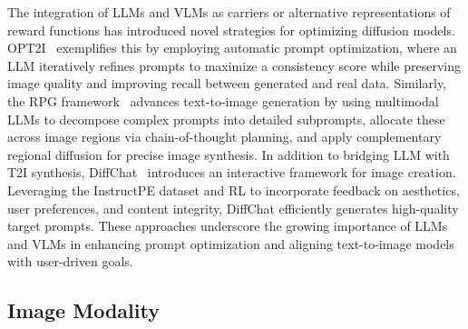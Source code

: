The integration of LLMs and VLMs as carriers or alternative representations of reward functions has introduced novel strategies for optimizing diffusion models. OPT2I~\citep{manas2024improving} exemplifies this by employing automatic prompt optimization, where an LLM iteratively refines prompts to maximize a consistency score while preserving image quality and improving recall between generated and real data. Similarly, the RPG framework~\citep{yang2024mastering} advances text-to-image generation by using multimodal LLMs to decompose complex prompts into detailed subprompts, allocate these across image regions via chain-of-thought planning, and apply complementary regional diffusion for precise image synthesis.
In addition to bridging LLM with T2I synthesis, DiffChat~\citep{wang2024diffchat} introduces an interactive framework for image creation. Leveraging the InstructPE dataset and RL to incorporate feedback on aesthetics, user preferences, and content integrity, DiffChat efficiently generates high-quality target prompts. These approaches underscore the growing importance of LLMs and VLMs in enhancing prompt optimization and aligning text-to-image models with user-driven goals.

\subsection{Image Modality }

